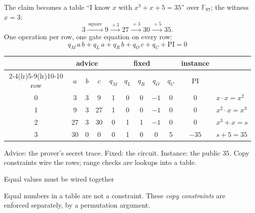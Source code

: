 \documentclass[aspectratio=169,11pt]{beamer}
\newcommand{\F}{\mathbb{F}}
\newcommand{\types}[1]{\par\smallskip{\small\color{arbdim}#1}\par}
\begin{document}
\begin{frame}{The claim becomes a table}
``I know $x$ with $x^3 + x + 5 = 35$'' over $\F_{97}$; the witness $x = 3$:
\[
3 \xrightarrow{\ \text{square}\ } 9 \xrightarrow{\ \times 3\ } 27
  \xrightarrow{\ + 3\ } 30 \xrightarrow{\ + 5\ } 35 .
\]
One operation per row, one gate equation on every row:
\[
q_M\, a\, b + q_L\, a + q_R\, b + q_O\, c + q_C + \mathrm{PI} = 0
\]
\types{every cell in $\F_{97}$.}
\begin{center}\small
\begin{tabular}{@{}c ccc ccccc c l@{}}
\toprule
& \multicolumn{3}{c}{advice} & \multicolumn{5}{c}{fixed} & instance & \\
\cmidrule(lr){2-4}\cmidrule(lr){5-9}\cmidrule(lr){10-10}
row & $a$ & $b$ & $c$ & $q_M$ & $q_L$ & $q_R$ & $q_O$ & $q_C$
  & $\mathrm{PI}$ & \\
\midrule
0 & 3 & 3 & 9 & 1 & 0 & 0 & $-1$ & 0 & 0 & $x \cdot x = x^2$ \\
1 & 9 & 3 & 27 & 1 & 0 & 0 & $-1$ & 0 & 0 & $x^2 \cdot x = x^3$ \\
2 & 27 & 3 & 30 & 0 & 1 & 1 & $-1$ & 0 & 0 & $x^3 + x = s$ \\
3 & 30 & 0 & 0 & 0 & 1 & 0 & 0 & 5 & $-35$ & $s + 5 = 35$ \\
\bottomrule
\end{tabular}
\end{center}
Advice: the prover's secret trace. Fixed: the circuit. Instance: the public
$35$.
Copy constraints wire the rows; range checks are lookups into a table.
\end{frame}

\begin{frame}{Equal values must be wired together}
\begin{center}
\end{center}
\vfill
Equal numbers in a table are not a constraint. These \emph{copy
constraints} are enforced separately, by a permutation argument.
\end{frame}
\end{document}
